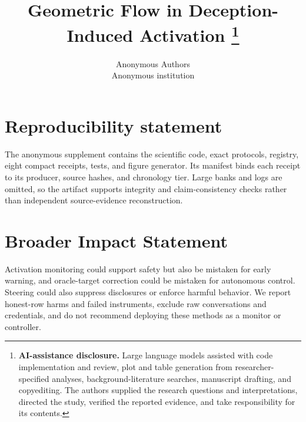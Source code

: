 \documentclass[10pt]{article}
\title{Geometric Flow in Deception-Induced Activation%
\thanks{\textbf{AI-assistance disclosure.} Large language models assisted with code
implementation and review, plot and table generation from researcher-specified analyses,
background-literature searches, manuscript drafting, and copyediting. The authors supplied the
research questions and interpretations, directed the study, verified the reported evidence, and
take responsibility for its contents.}}
\author{\name Anonymous Authors \\
        \addr Anonymous institution}
\begin{document}
\maketitle









\section{Reproducibility statement}

The anonymous supplement contains the scientific code, exact protocols, registry, eight compact
receipts, tests, and figure generator. Its manifest binds each receipt to its producer, source hashes,
and chronology tier. Large banks and logs are omitted, so the artifact supports integrity and
claim-consistency checks rather than independent source-evidence reconstruction.

\section*{Broader Impact Statement}

Activation monitoring could support safety but also be mistaken for early warning, and
oracle-target correction could be mistaken for autonomous control. Steering could also suppress
disclosures or enforce harmful behavior. We report honest-row harms and failed instruments, exclude
raw conversations and credentials, and do not recommend deploying these methods as a monitor or
controller.




\appendix



\end{document}
